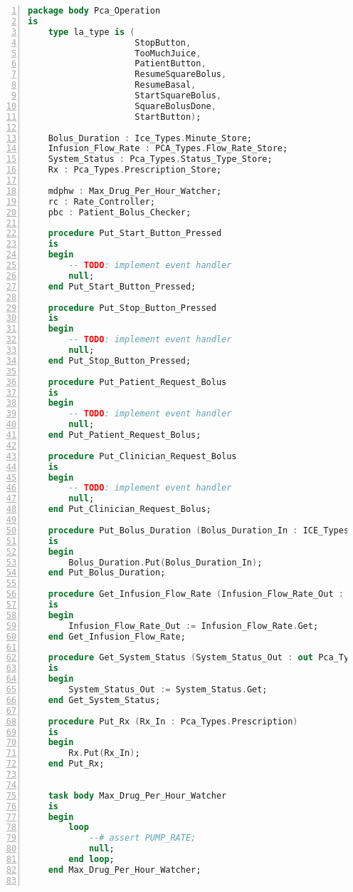 \begin{lstlisting}[language=ada, gobble=0, numbers=left, caption={\lstinline{Pca_Operation} package}]
package body Pca_Operation
is
    type la_type is (
                     StopButton,
                     TooMuchJuice,
                     PatientButton,
                     ResumeSquareBolus,
                     ResumeBasal,
                     StartSquareBolus,
                     SquareBolusDone,
                     StartButton);

    Bolus_Duration : Ice_Types.Minute_Store;
    Infusion_Flow_Rate : PCA_Types.Flow_Rate_Store;
    System_Status : Pca_Types.Status_Type_Store;
    Rx : Pca_Types.Prescription_Store;

    mdphw : Max_Drug_Per_Hour_Watcher;
    rc : Rate_Controller;
    pbc : Patient_Bolus_Checker;

    procedure Put_Start_Button_Pressed
    is
    begin
        -- TODO: implement event handler
        null;
    end Put_Start_Button_Pressed;

    procedure Put_Stop_Button_Pressed
    is
    begin
        -- TODO: implement event handler
        null;
    end Put_Stop_Button_Pressed;

    procedure Put_Patient_Request_Bolus
    is
    begin
        -- TODO: implement event handler
        null;
    end Put_Patient_Request_Bolus;

    procedure Put_Clinician_Request_Bolus
    is
    begin
        -- TODO: implement event handler
        null;
    end Put_Clinician_Request_Bolus;

    procedure Put_Bolus_Duration (Bolus_Duration_In : ICE_Types.Minute)
    is
    begin
        Bolus_Duration.Put(Bolus_Duration_In);
    end Put_Bolus_Duration;

    procedure Get_Infusion_Flow_Rate (Infusion_Flow_Rate_Out : out Pca_Types.Flow_Rate)
    is
    begin
        Infusion_Flow_Rate_Out := Infusion_Flow_Rate.Get;
    end Get_Infusion_Flow_Rate;

    procedure Get_System_Status (System_Status_Out : out Pca_Types.Status_Type)
    is
    begin
        System_Status_Out := System_Status.Get;
    end Get_System_Status;

    procedure Put_Rx (Rx_In : Pca_Types.Prescription)
    is
    begin
        Rx.Put(Rx_In);
    end Put_Rx;


    task body Max_Drug_Per_Hour_Watcher
    is
    begin
        loop
            --# assert PUMP_RATE;
            null;
        end loop;
    end Max_Drug_Per_Hour_Watcher;


\end{lstlisting}
